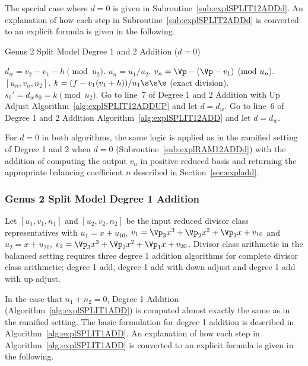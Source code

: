 The special case where $d=0$ is given in Subroutine~\ref{sub:explSPLIT12ADDd}. An
explanation of how each step in Subroutine~\ref{sub:explSPLIT2ADDd} is converted
to an explicit formula is given in the following. 

\begin{subroutine}[htbp]
\caption{Genus 2 Split Model Degree 1 and 2 Addition ($d = 0$) \label{sub:explSPLIT12ADDd}}
\begin{algorithmic} [1]
\State $d_w = v_2 - v_1 - h \pmod{u_2}$.
    \State $u_n = u_1/u_2$.
    \State $v_n = \Vp - (\Vp - v_1) \pmod{u_n}.$
    \State \Return $[u_n,v_n,n_2]$.
\Else 
    \State $k = (f - v_1(v_1 + h))/u_1 \s\s\s$ (exact division).
    \State $s_0' = d_ws_0 = k \pmod{u_2}$.
        \State Go to line~7 of Degree 1 and 2 Addition with Up Adjust Algorithm~\ref{alg:explSPLIT12ADDUP} and let $d = d_w$.
    \Else 
        \State Go to line~6 of Degree 1 and 2 Addition Algorithm~\ref{alg:explSPLIT12ADD} and let $d = d_w$.
    \EndIf
\EndIf
\end{algorithmic}
\end{subroutine}


For $d=0$ in both algorithms, the same logic is applied as in the ramified
setting of Degree 1 and 2 when $d=0$ (Subroutine~\ref{sub:explRAM12ADDd}) with the
addition of computing the output $v_{n}$ in positive reduced basis and returning
the appropriate balancing coefficient $n$ described in
Section~\ref{sec:expladd}.



\subsubsection{Genus 2 Split Model Degree 1 Addition}
Let $[u_1,v_1,n_1]$ and $[u_2,v_2,n_2]$ be the input reduced divisor class
representatives with $u_1 = x + u_{10}$, $v_1 = \Vp_3x^3 + \Vp_2x^2 + \Vp_1x +
v_{10}$ and $u_2 = x + u_{20}$, $v_2 = \Vp_3x^3 + \Vp_2x^2 + \Vp_1x + v_{20}$.
Divisor class arithmetic in the balanced setting requires three degree 1
addition algorithms for complete divisor class arithmetic; degree 1 add, degree
1 add with down adjust and degree 1 add with up adjust. 

In the case that $n_1 + n_2 = 0$, Degree 1 Addition
(Algorithm~\ref{alg:explSPLIT1ADD}) is computed almost exactly the same as in the
ramified setting. The basic formulation for degree 1 addition is described in
Algorithm~\ref{alg:explSPLIT1ADD}. An explanation of how each step in
Algorithm~\ref{alg:explSPLIT1ADD} is converted to an explicit formula is given
in the following.

